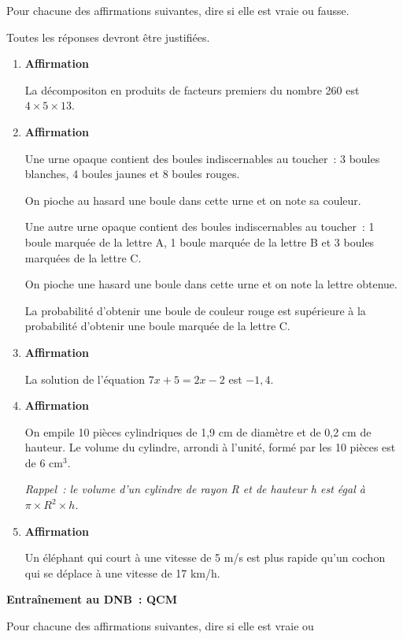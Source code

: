 \documentclass{dnbqcm}
\begin{document}
Pour chacune des affirmations suivantes, dire si elle est vraie ou
fausse.\par\bigskip\noindent Toutes les réponses devront être
justifiées.
\begin{enumerate}
    \item {\bfseries Affirmation }\par La décompositon en
    produits de facteurs premiers du nombre 260 est $4\times5\times13$.
    \item {\bfseries Affirmation }\par Une urne opaque contient des boules
    indiscernables au toucher~: 3 boules blanches, 4 boules jaunes et 8 boules rouges.
    \par\noindent On pioche au hasard une boule dans cette urne et on note sa couleur.
    \par\medskip\noindent Une autre urne opaque contient des boules indiscernables au
    toucher~: 1 boule marquée de la lettre A, 1 boule marquée de la lettre B et 3
    boules marquées de la lettre C.\par\noindent
    On pioche une hasard une boule dans cette urne et on note la lettre obtenue.

    \par\medskip\noindent La probabilité d'obtenir une boule de couleur rouge est
    supérieure à la probabilité d'obtenir une boule marquée de la lettre C.
    \item {\bfseries Affirmation }\par La solution de l'équation
    $7x+5=2x-2$ est $-1,4$.
    \item {\bfseries Affirmation }\par On empile 10 pièces cylindriques
    de 1,9 cm de diamètre et de 0,2 cm de hauteur. Le volume du cylindre, arrondi à
    l'unité, formé par les 10 pièces est de 6 cm$^3$.\par\medskip\noindent
    {\itshape Rappel~: le volume d'un cylindre de rayon R et de hauteur h est égal à
    $\pi\times R^2\times h$.}
    \item {\bfseries Affirmation }\par Un éléphant qui court à une
    vitesse de 5 m/s est plus rapide qu'un cochon qui se déplace à une vitesse de 17 km/h.
\end{enumerate}
\newpage
{\centering\bfseries\Large Entraînement au DNB~: QCM\par}\bigskip\noindent
Pour chacune des affirmations suivantes, dire si elle est vraie ou
\end{document}
